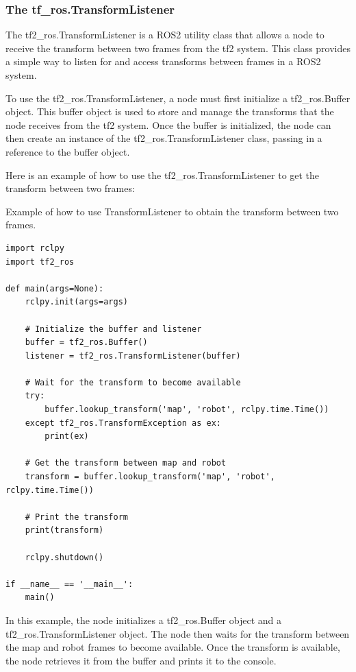 \documentclass[12pt,oneside]{article}
\begin{document}
\subsubsection{The tf\_ros.TransformListener}\label{ros2-transform-listener}
The tf2\_ros.TransformListener is a ROS2 utility class that allows a node to receive the transform between two frames from the tf2 system. This class provides a simple way to listen for and access transforms between frames in a ROS2 system.

To use the tf2\_ros.TransformListener, a node must first initialize a tf2\_ros.Buffer object. This buffer object is used to store and manage the transforms that the node receives from the tf2 system. Once the buffer is initialized, the node can then create an instance of the tf2\_ros.TransformListener class, passing in a reference to the buffer object.

Here is an example of how to use the tf2\_ros.TransformListener to get the transform between two frames:
\begin{listing}[H]
\caption{Example of how to use TransformListener to obtain the transform between two frames.}
\label{code:transformliseter}
\begin{verbatim}
import rclpy
import tf2_ros

def main(args=None):
    rclpy.init(args=args)

    # Initialize the buffer and listener
    buffer = tf2_ros.Buffer()
    listener = tf2_ros.TransformListener(buffer)

    # Wait for the transform to become available
    try:
        buffer.lookup_transform('map', 'robot', rclpy.time.Time())
    except tf2_ros.TransformException as ex:
        print(ex)

    # Get the transform between map and robot
    transform = buffer.lookup_transform('map', 'robot', rclpy.time.Time())

    # Print the transform
    print(transform)

    rclpy.shutdown()

if __name__ == '__main__':
    main()

\end{verbatim}
\end{listing} 

In this example, the node initializes a tf2\_ros.Buffer object and a tf2\_ros.TransformListener object. The node then waits for the transform between the map and robot frames to become available. Once the transform is available, the node retrieves it from the buffer and prints it to the console.
\end{document}
